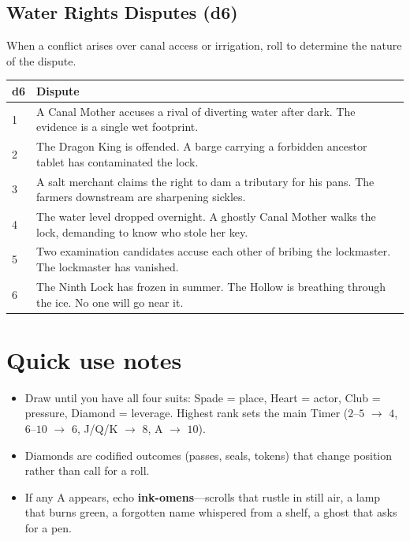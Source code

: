 \subsection*{Water Rights Disputes (d6)}
\label{sec:sihai-water-disputes}

When a conflict arises over canal access or irrigation, roll to determine the nature of the dispute.

\begin{longtable}{|p{1.5cm}|p{10cm}|}
\hline
\rowcolor{gray!20}
\textbf{d6} & \textbf{Dispute} \\
\hline
1 & A Canal Mother accuses a rival of diverting water after dark. The evidence is a single wet footprint. \\
\hline
2 & The Dragon King is offended. A barge carrying a forbidden ancestor tablet has contaminated the lock. \\
\hline
3 & A salt merchant claims the right to dam a tributary for his pans. The farmers downstream are sharpening sickles. \\
\hline
4 & The water level dropped overnight. A ghostly Canal Mother walks the lock, demanding to know who stole her key. \\
\hline
5 & Two examination candidates accuse each other of bribing the lockmaster. The lockmaster has vanished. \\
\hline
6 & The Ninth Lock has frozen in summer. The Hollow is breathing through the ice. No one will go near it. \\
\hline
\end{longtable}

\section*{Quick use notes}
\label{sec:sihai-quick-use}
\begin{itemize}
\item Draw until you have all four suits: Spade = place, Heart = actor, Club = pressure, Diamond = leverage. Highest rank sets the main Timer ($2$--$5$ $\rightarrow$ $4$, $6$--$10$ $\rightarrow$ $6$, J/Q/K $\rightarrow$ $8$, A $\rightarrow$ $10$).
\item Diamonds are codified outcomes (passes, seals, tokens) that change position rather than call for a roll.
\item If any A appears, echo \textbf{ink-omens}---scrolls that rustle in still air, a lamp that burns green, a forgotten name whispered from a shelf, a ghost that asks for a pen.
\end{itemize}

